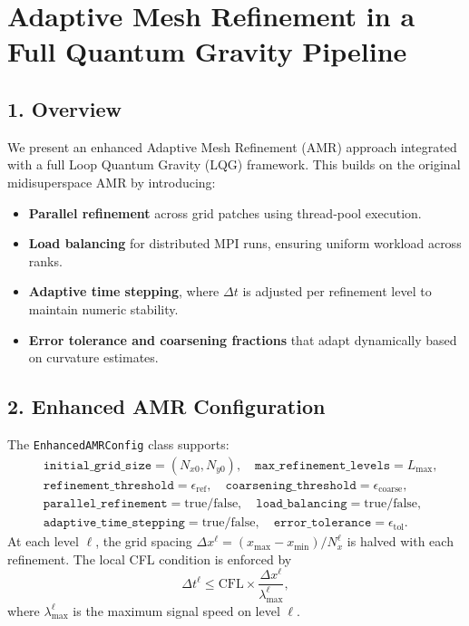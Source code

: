 \documentclass[12pt]{article}
\begin{document}
\section*{Adaptive Mesh Refinement in a Full Quantum Gravity Pipeline}

\subsection*{1. Overview}
We present an enhanced Adaptive Mesh Refinement (AMR) approach integrated with a full Loop Quantum Gravity (LQG) framework.  This builds on the original midisuperspace AMR by introducing:
\begin{itemize}
  \item \textbf{Parallel refinement} across grid patches using thread‐pool execution.
  \item \textbf{Load balancing} for distributed MPI runs, ensuring uniform workload across ranks.
  \item \textbf{Adaptive time stepping}, where $\Delta t$ is adjusted per refinement level to maintain numeric stability.
  \item \textbf{Error tolerance and coarsening fractions} that adapt dynamically based on curvature estimates.
\end{itemize}

\subsection*{2. Enhanced AMR Configuration}
The \texttt{EnhancedAMRConfig} class supports:
\begin{align*}
  &\texttt{initial\_grid\_size} = (N_{x0}, N_{y0}), \quad
    \texttt{max\_refinement\_levels} = L_{\max}, \\
  &\texttt{refinement\_threshold} = \epsilon_\text{ref}, \quad
    \texttt{coarsening\_threshold} = \epsilon_\text{coarse}, \\
  &\texttt{parallel\_refinement} = \text{true/false}, \quad
    \texttt{load\_balancing} = \text{true/false}, \\
  &\texttt{adaptive\_time\_stepping} = \text{true/false}, \quad
    \texttt{error\_tolerance} = \epsilon_\text{tol}.
\end{align*}
At each level $\ell$, the grid spacing $\Delta x^\ell = (x_{\max}-x_{\min})/N_{x}^\ell$ is halved with each refinement.  The local CFL condition is enforced by 
\[
  \Delta t^\ell \le \mathrm{CFL}\times \frac{\Delta x^\ell}{\lambda_\text{max}^\ell},
\]
where $\lambda_\text{max}^\ell$ is the maximum signal speed on level $\ell$.
\end{document}
